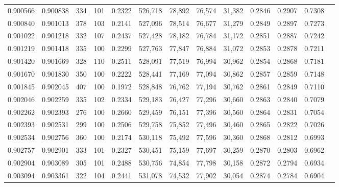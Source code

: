 \begin{tabular}{rrrrrrrrrrrrr}
0.900566 & 0.900838 &   334 & 101 &                                     0.2322 & 526,718 &  78,892 &  76,574 &  31,382 & 0.2846 & 0.2907 & 0.7308 \\
0.900840 & 0.901013 &   378 & 103 &                                     0.2141 & 527,096 &  78,514 &  76,677 &  31,279 & 0.2849 & 0.2897 & 0.7273 \\
0.901022 & 0.901218 &   332 & 107 &                                     0.2437 & 527,428 &  78,182 &  76,784 &  31,172 & 0.2851 & 0.2887 & 0.7242 \\
0.901219 & 0.901418 &   335 & 100 &                                     0.2299 & 527,763 &  77,847 &  76,884 &  31,072 & 0.2853 & 0.2878 & 0.7211 \\
0.901420 & 0.901669 &   328 & 110 &                                     0.2511 & 528,091 &  77,519 &  76,994 &  30,962 & 0.2854 & 0.2868 & 0.7181 \\
0.901670 & 0.901830 &   350 & 100 &                                     0.2222 & 528,441 &  77,169 &  77,094 &  30,862 & 0.2857 & 0.2859 & 0.7148 \\
0.901845 & 0.902045 &   407 & 100 &                                     0.1972 & 528,848 &  76,762 &  77,194 &  30,762 & 0.2861 & 0.2849 & 0.7110 \\
0.902046 & 0.902259 &   335 & 102 &                                     0.2334 & 529,183 &  76,427 &  77,296 &  30,660 & 0.2863 & 0.2840 & 0.7079 \\
0.902262 & 0.902393 &   276 & 100 &                                     0.2660 & 529,459 &  76,151 &  77,396 &  30,560 & 0.2864 & 0.2831 & 0.7054 \\
0.902393 & 0.902531 &   299 & 100 &                                     0.2506 & 529,758 &  75,852 &  77,496 &  30,460 & 0.2865 & 0.2822 & 0.7026 \\
0.902534 & 0.902756 &   360 & 100 &                                     0.2174 & 530,118 &  75,492 &  77,596 &  30,360 & 0.2868 & 0.2812 & 0.6993 \\
0.902757 & 0.902901 &   333 & 101 &                                     0.2327 & 530,451 &  75,159 &  77,697 &  30,259 & 0.2870 & 0.2803 & 0.6962 \\
0.902904 & 0.903089 &   305 & 101 &                                     0.2488 & 530,756 &  74,854 &  77,798 &  30,158 & 0.2872 & 0.2794 & 0.6934 \\
0.903094 & 0.903361 &   322 & 104 &                                     0.2441 & 531,078 &  74,532 &  77,902 &  30,054 & 0.2874 & 0.2784 & 0.6904 \\

\end{tabular}
